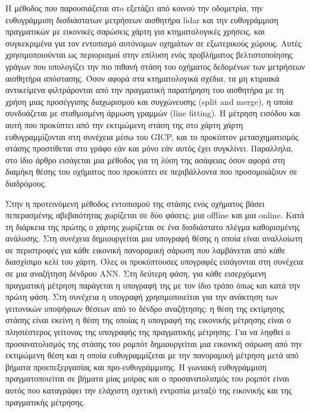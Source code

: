 Η μέθοδος που παρουσιάζεται στo \cite{Bresson2019a} εξετάζει από κοινού την
οδομετρία, την ευθυγράμμιση δισδιάστατων μετρήσεων αισθητήρα lidar και την
ευθυγράμμιση πραγματικών με εικονικές σαρώσεις χάρτη για κτηματολογικές
χρήσεις, και συγκεκριμένα για τον εντοπισμό αυτόνομων οχημάτων σε εξωτερικούς
χώρους. Αυτές χρησιμοποιούνται ως περιορισμοί στην επίλυση ενός προβλήματος
βελτιστοποίησης γράγων που υπολογίζει την πιο πιθανή στάση του οχήματος
δεδομένων των μετρήσεων αισθητήρα απόστασης.  Όσον αφορά στα κτηματολογικά
σχέδια, τα μη κτιριακά αντικείμενα φιλτράρονται από την πραγματική παρατήρηση
του αισθητήρα με τη χρήση μιας προσέγγισης διαχωρισμού και συγχώνευσης (split
and merge), η οποία συνδυάζεται με σταθμισμένη άρμωση γραμμών (line fitting). Η
μέτρηση εισόδου και αυτή που προκύπτει από την εκτιμώμενη στάση της στο χάρτη
χάρτη ευθυγραμμίζονται στη συνέχεια μέσω του GICP, και το προκύπτον
μετασχηματισμός στάσης προστίθεται στο γράφο εάν και μόνο εάν αυτός έχει
συγκλίνει. Παραλληλα, στο ίδιο άρθρο εισάγεται μια μέθοδος για τη λύση της
ασάφειας όσον αφορά στη διαμήκη θέσης του οχήματος που προκύπτει σε
περιβάλλοντα που προσομοιάζουν σε διαδρόμους.

Στην \cite{Wang2021a} η προτεινόμενη μέθοδος εντοπισμού της στάσης ενός
οχήματος βάσει πεπερασμένης αβεβαιότητας χωρίζεται σε δύο φάσεις: μια offline
και μια online. Κατά τη διάρκεια της πρώτης ο χάρτης χωρίζεται σε ένα
δισδιάστατο πλέγμα καθορισμένης ανάλυσης. Στη συνέχεια δημιουργείται μια
υπογραφή θέσης η οποία είναι αναλλοίωτη σε περιστροφές για κάθε εικονική
πανοραμική σάρωση που λαμβάνεται από κάθε διασχίσιμο κελί του χάρτη. Όλες οι
προκύπτουσες υπογραφές εισάγονται στη συνέχεια σε μια αναζήτηση δένδρου ANN.
Στη δεύτερη φάση, για κάθε εισερχόμενη πραγματική μέτρηση παράγεται η υπογραφή
της με τον ίδιο τρόπο όπως και κατά την πρώτη φάση. Στη συνέχεια η υπογραφή
χρησιμοποιείται για την ανάκτηση των γειτονικών υποψήφιων θέσεων από το δένδρο
αναζήτησης: η θέση της εκτίμησης στάσης είναι εκείνη η θέση της οποίας η
υπογραφή της εικονικής μέτρησης είναι ο πλησιέστερος γείτονας της υπογραφής της
πραγματικής μέτρησης.  Για να ληφθεί ο προσανατολισμός της στάσης του ρομπότ
δημιουργείται μια εικονική σάρωση από την εκτιμώμενη θέση και η οποία
ευθυγραμμίζεται με την πανοραμική μέτρηση μετά από βήματα προεπεξεργασίας και
προ-ευθυγράμμισης. Η γωνιακή ευθυγράμμιση πραγματοποιείται σε βήματα μίας
μοίρας και ο προσανατολισμός του ρομπότ είναι αυτός που καταγράφει την ελάχιστη
σχετική εντροπία μεταξύ της εικονικής και της πραγματικής μέτρησης.
